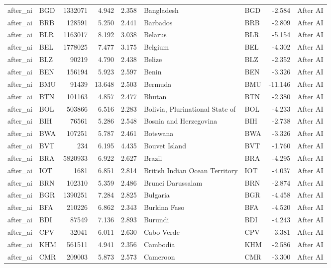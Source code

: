 \begin{tabular}{llrrrllrl}
after\_ai & BGD & 1332071 & 4.942 & 2.358 & Bangladesh & BGD & -2.584 & After AI \\
after\_ai & BRB & 128591 & 5.250 & 2.441 & Barbados & BRB & -2.809 & After AI \\
after\_ai & BLR & 1163017 & 8.192 & 3.038 & Belarus & BLR & -5.154 & After AI \\
after\_ai & BEL & 1778025 & 7.477 & 3.175 & Belgium & BEL & -4.302 & After AI \\
after\_ai & BLZ & 90219 & 4.790 & 2.438 & Belize & BLZ & -2.352 & After AI \\
after\_ai & BEN & 156194 & 5.923 & 2.597 & Benin & BEN & -3.326 & After AI \\
after\_ai & BMU & 91439 & 13.648 & 2.503 & Bermuda & BMU & -11.146 & After AI \\
after\_ai & BTN & 101163 & 4.857 & 2.477 & Bhutan & BTN & -2.380 & After AI \\
after\_ai & BOL & 503866 & 6.516 & 2.283 & Bolivia, Plurinational State of & BOL & -4.233 & After AI \\
after\_ai & BIH & 76561 & 5.286 & 2.548 & Bosnia and Herzegovina & BIH & -2.738 & After AI \\
after\_ai & BWA & 107251 & 5.787 & 2.461 & Botswana & BWA & -3.326 & After AI \\
after\_ai & BVT & 234 & 6.195 & 4.435 & Bouvet Island & BVT & -1.760 & After AI \\
after\_ai & BRA & 5820933 & 6.922 & 2.627 & Brazil & BRA & -4.295 & After AI \\
after\_ai & IOT & 1681 & 6.851 & 2.814 & British Indian Ocean Territory & IOT & -4.037 & After AI \\
after\_ai & BRN & 102310 & 5.359 & 2.486 & Brunei Darussalam & BRN & -2.874 & After AI \\
after\_ai & BGR & 1390251 & 7.284 & 2.825 & Bulgaria & BGR & -4.458 & After AI \\
after\_ai & BFA & 210226 & 6.862 & 2.343 & Burkina Faso & BFA & -4.520 & After AI \\
after\_ai & BDI & 87549 & 7.136 & 2.893 & Burundi & BDI & -4.243 & After AI \\
after\_ai & CPV & 32041 & 6.011 & 2.630 & Cabo Verde & CPV & -3.381 & After AI \\
after\_ai & KHM & 561511 & 4.941 & 2.356 & Cambodia & KHM & -2.586 & After AI \\
after\_ai & CMR & 209003 & 5.873 & 2.573 & Cameroon & CMR & -3.300 & After AI \\

\end{tabular}
